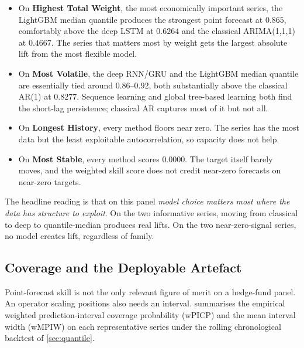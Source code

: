 \begin{itemize}
  \item On \textbf{Highest Total Weight}, the most economically important series, the LightGBM median quantile produces the strongest point forecast at $0.865$, comfortably above the deep LSTM at $0.6264$ and the classical ARIMA(1,1,1) at $0.4667$. The series that matters most by weight gets the largest absolute lift from the most flexible model.
  \item On \textbf{Most Volatile}, the deep RNN/GRU and the LightGBM median quantile are essentially tied around $0.86$--$0.92$, both substantially above the classical AR(1) at $0.8277$. Sequence learning and global tree-based learning both find the short-lag persistence; classical AR captures most of it but not all.
  \item On \textbf{Longest History}, every method floors near zero. The series has the most data but the least exploitable autocorrelation, so capacity does not help.
  \item On \textbf{Most Stable}, every method scores $0.0000$. The target itself barely moves, and the weighted skill score does not credit near-zero forecasts on near-zero targets.
\end{itemize}

The headline reading is that on this panel \emph{model choice matters most where the data has structure to exploit}. On the two informative series, moving from classical to deep to quantile-median produces real lifts. On the two near-zero-signal series, no model creates lift, regardless of family.

\subsection{Coverage and the Deployable Artefact}
\label{sec:analysis:coverage}

Point-forecast skill is not the only relevant figure of merit on a hedge-fund panel. An operator scaling positions also needs an interval.  summarises the empirical weighted prediction-interval coverage probability (wPICP) and the mean interval width (wMPIW) on each representative series under the rolling chronological backtest of \cref{sec:quantile}.

